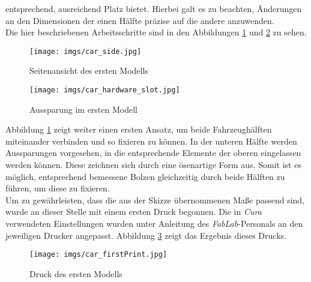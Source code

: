 \documentclass[.../Dokumentation.tex]{subfiles}
\begin{document}
entsprechend, ausreichend Platz bietet.
Hierbei galt es zu beachten, Änderungen an den Dimensionen der einen 
Hälfte präzise auf die andere anzuwenden.\\
Die hier beschriebenen Arbeitsschritte sind in den Abbildungen 
\ref{fig-car-side} und \ref{fig-car-slot} zu sehen.
\begin{figure}[H]
\begin{center}
    \texttt{[image: imgs/car\_side.jpg]}
    \caption{Seitenansicht des ersten Modells}
    \label{fig-car-side}
\end{center}
\end{figure}
\begin{figure}[H]
\begin{center}
    \texttt{[image: imgs/car\_hardware\_slot.jpg]}
    \caption{Aussparung im ersten Modell}
    \label{fig-car-slot}
\end{center}
\end{figure}
\noindent
Abbildung \ref{fig-car-side} zeigt weiter einen ersten Ansatz, um beide 
Fahrzeughälften miteinander verbinden und so fixieren zu können. 
In der unteren Hälfte werden Aussparungen vorgesehen, in die entsprechende 
Elemente der oberen eingelassen werden können. Diese zeichnen sich durch eine 
ösenartige Form aus. Somit ist es möglich, entsprechend bemessene Bolzen 
gleichzeitig durch beide Hälften zu führen, um diese zu fixieren.\\
Um zu gewährleisten, dass die aus der Skizze übernommenen Maße 
passend sind, wurde an dieser Stelle mit einem ersten Druck begonnen.
Die in \textit{Cura} verwendeten Einstellungen wurden unter Anleitung 
des \textit{FabLab}-Personals an den jeweiligen Drucker angepasst. 
Abbildung \ref{fig-car-firstPrint} zeigt das Ergebnis dieses Drucks.
\begin{figure}[H]
    \begin{center}
        \texttt{[image: imgs/car\_firstPrint.jpg]}
        \caption{Druck des ersten Modells}
        \label{fig-car-firstPrint}
    \end{center}
    \end{figure}
\end{document}
